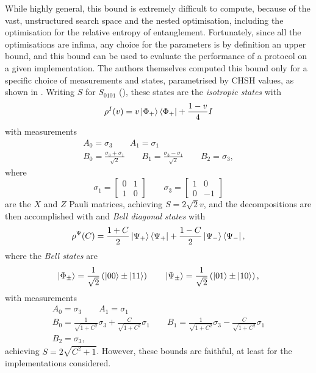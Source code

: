 \documentclass[10pt, a4paper]{article}
\numberwithin{equation}{section} %
\theoremstyle{definition}
\theoremstyle{plain}
\newcommand{\?}{\mathrel{?}} %
\begin{document}
    While highly general, this bound is extremely difficult to compute, because of the vast, unstructured search space and the nested optimisation, including the optimisation for the relative entropy of entanglement. Fortunately, since all the optimisations are infima, any choice for the parameters is by definition an upper bound, and this bound can be used to evaluate the performance of a protocol on a given implementation. The authors themselves computed this bound only for a specific choice of measurements and states, parametrised by CHSH values, as shown in . Writing \(S\) for \(S_{0101}\) (), these states are the \emph{isotropic states} with
    \begin{equation}
      \rho^{I}(v) = v\ket{\Phi_+}\bra{\Phi_+} + \frac{1-v}{4}I
    \end{equation}
    with measurements
    \begin{gather*}
      A_0 = \sigma_3 \qquad A_1 = \sigma_1 \\
      B_0 = \frac{\sigma_3 + \sigma_1}{\sqrt{2}} \qquad B_1 = \frac{\sigma_3 - \sigma_1}{\sqrt{2}} \qquad B_2 = \sigma_3,
    \end{gather*}
    where
    \[ \sigma_1 = \begin{bmatrix} 0 & 1 \\ 1 &  0 \end{bmatrix} \qquad \sigma_3 = \begin{bmatrix} 1 & 0 \\ 0 & -1 \end{bmatrix} \]
    are the \(X\) and \(Z\) Pauli matrices, achieving \(S = 2\sqrt{2}v\), and the decompositions are then accomplished with and \emph{Bell diagonal states} with
    \begin{equation}
      \rho^{\Psi}(C) = \frac{1+C}{2}\ket{\Psi_+}\bra{\Psi_+} + \frac{1-C}{2}\ket{\Psi_-}\bra{\Psi_-},
    \end{equation}
    where the \emph{Bell states} are
    \begin{equation}
      \ket{\Phi_{\pm}} = \frac{1}{\sqrt{2}}\left( \ket{00} \pm \ket{11} \right) \qquad \ket{\Psi_{\pm}} = \frac{1}{\sqrt{2}}\left( \ket{01} \pm \ket{10} \right),
    \end{equation}
    with measurements
    \begin{gather*}
      A_0 = \sigma_3 \qquad A_1 = \sigma_1 \\
    B_0 = \frac{1}{\sqrt{1+C^2}}\sigma_3 + \frac{C}{\sqrt{1+C^2}}\sigma_1 \qquad B_1 = \frac{1}{\sqrt{1+C^2}}\sigma_3 - \frac{C}{\sqrt{1+C^2}}\sigma_1 \\
    B_2 = \sigma_3,
    \end{gather*}
    achieving \(S = 2\sqrt{C^2+1}\). However, these bounds are faithful, at least for the implementations considered.
\end{document}
